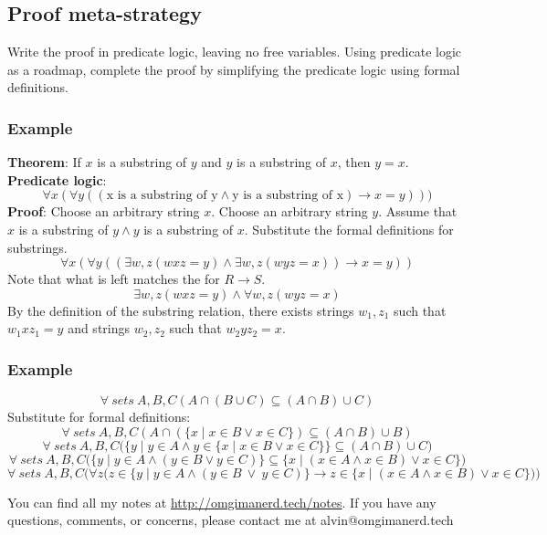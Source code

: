 \documentclass[letterpaper, 12pt]{math}
\begin{document}
\subsection*{Proof meta-strategy}
Write the proof in predicate logic, leaving no free variables. Using predicate
logic as a roadmap, complete the proof by simplifying the predicate logic
using formal definitions.

\subsubsection*{Example}
\textbf{Theorem}: If \( x \) is a substring of \( y \) and \( y \) is a
substring of \( x \), then \( y = x \). \\
\textbf{Predicate logic}:
\[ \forall{x}(\forall{y}((\text{x is a substring of y}\wedge\text{y is a
  substring of x})\to x = y))) \]
\textbf{Proof}: Choose an arbitrary string \( x \). Choose an arbitrary string
\( y \). Assume that \( x \) is a substring of \( y\wedge y \) is a substring of
\( x \). Substitute the formal definitions for substrings.
\[ \forall{x}(\forall{y}((\exists{w,z}(wxz = y)\wedge\exists{w,z}(wyz = x))\to
  x = y)) \]
Note that what is left matches the for \( R\to S \).
\[ \exists{w,z}(wxz = y)\wedge\forall{w,z}(wyz = x) \]
By the definition of the substring relation, there exists strings \( w_1,z_1 \)
such that \( w_1xz_1 = y \) and strings \( w_2,z_2 \) such that
\( w_2yz_2 = x \).

\subsubsection*{Example}
\[ \forall\ sets\ A,B,C (A \cap (B \cup C) \subseteq (A \cap B) \cup C) \]
Substitute for formal definitions:
\[ \forall\ sets\ A,B,C (A \cap (\{x\mid x\in B\vee x\in C\}) \subseteq
  (A \cap B) \cup B) \]
\[ \forall\ sets\ A,B,C \bigg(\big\{y\mid y\in A \wedge y\in\{x\mid x\in B\vee
  x\in C\}\big\} \subseteq (A \cap B) \cup C\bigg) \]
\[ \forall\ sets\ A,B,C \bigg(\big\{y\mid y\in A\wedge(y\in B\vee y\in
  C)\big\} \subseteq \big\{x\mid(x\in A\wedge x\in B)\vee x\in C\big\}\bigg) \]
\[ \forall\ sets\ A,B,C \Bigg(\forall{z}\bigg(z\in \big\{y\mid y\in A \wedge
  (y\in B\ \vee\ y\in C)\big\} \to z\in\big\{x\mid(x\in A\wedge x\in B)\vee x\in C\big\}\bigg)\Bigg) \]

\begin{center}
  You can find all my notes at \url{http://omgimanerd.tech/notes}. If you have
  any questions, comments, or concerns, please contact me at
  alvin@omgimanerd.tech
\end{center}
\end{document}
